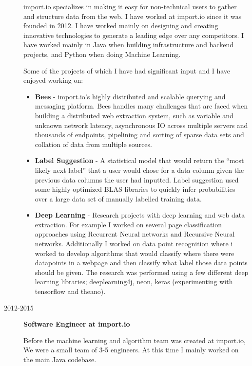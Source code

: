 \documentclass[a4paper]{article}
\def\tightlist{}
\begin{document}
\begin{description}
import.io specializes in making it easy for non-technical users to
gather and structure data from the web. I have worked at import.io since
it was founded in 2012. I have worked mainly on designing and creating
innovative technologies to generate a leading edge over any competitors.
I have worked mainly in Java when building infrastructure and backend
projects, and Python when doing Machine Learning.

Some of the projects of which I have had significant input and I have
enjoyed working on:

\begin{itemize}
\tightlist
\item
  \textbf{Bees} - import.io's highly distributed and scalable querying
  and messaging platform. Bees handles many challenges that are faced
  when building a distributed web extraction system, such as variable
  and unknown network latency, asynchronous IO across multiple servers
  and thousands of endpoints, pipelining and sorting of sparse data sets
  and collation of data from multiple sources.
\item
  \textbf{Label Suggestion} - A statistical model that would return the
  ``most likely next label'' that a user would chose for a data column
  given the previous data columns the user had inputted. Label
  suggestion used some highly optimized BLAS libraries to quickly infer
  probabilities over a large data set of manually labelled training
  data.
\item
  \textbf{Deep Learning} - Research projects with deep learning and web
  data extraction. For example I worked on several page classification
  approaches using Recurrent Neural networks and Recursive Neural
  networks. Additionally I worked on data point recognition where i
  worked to develop algorithms that would classify where there were
  datapoints in a webpage and then classify what label those data points
  should be given. The research was performed using a few different deep
  learning libraries; deeplearning4j, neon, keras (experimenting with
  tensorflow and theano).
\end{itemize}
\item[2012-2015]
\textbf{Software Engineer at import.io}

Before the machine learning and algorithm team was created at import.io,
We were a small team of 3-5 engineers. At this time I mainly worked on
the main Java codebase.

\end{description}
\end{document}
